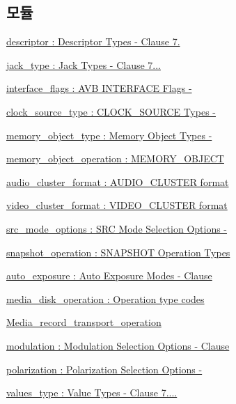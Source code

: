 \subsection*{모듈}
\begin{DoxyCompactItemize}
\item 
\hyperlink{group__descriptor}{descriptor \+: Descriptor Types -\/ Clause 7.}
\item 
\hyperlink{group__jack__type}{jack\+\_\+type \+: Jack Types -\/ Clause 7...}
\item 
\hyperlink{group__avb__interface__flags}{interface\+\_\+flags \+: A\+V\+B I\+N\+T\+E\+R\+F\+A\+C\+E Flags -\/}
\item 
\hyperlink{group__clock__source__type}{clock\+\_\+source\+\_\+type \+: C\+L\+O\+C\+K\+\_\+\+S\+O\+U\+R\+C\+E Types -\/}
\item 
\hyperlink{group__memory__object__type}{memory\+\_\+object\+\_\+type \+: Memory Object Types -\/}
\item 
\hyperlink{group__memory__object__operation}{memory\+\_\+object\+\_\+operation \+: M\+E\+M\+O\+R\+Y\+\_\+\+O\+B\+J\+E\+CT}
\item 
\hyperlink{group__audio__cluster__format}{audio\+\_\+cluster\+\_\+format \+: A\+U\+D\+I\+O\+\_\+\+C\+L\+U\+S\+T\+E\+R format}
\item 
\hyperlink{group__video__cluster__format}{video\+\_\+cluster\+\_\+format \+: V\+I\+D\+E\+O\+\_\+\+C\+L\+U\+S\+T\+E\+R format}
\item 
\hyperlink{group__src__mode__options}{src\+\_\+mode\+\_\+options \+: S\+R\+C Mode Selection Options -\/}
\item 
\hyperlink{group__snapshot__operation}{snapshot\+\_\+operation \+: S\+N\+A\+P\+S\+H\+O\+T Operation Types}
\item 
\hyperlink{group__auto__exposure}{auto\+\_\+exposure \+: Auto Exposure Modes -\/ Clause}
\item 
\hyperlink{group__media__disk__operation}{media\+\_\+disk\+\_\+operation \+: Operation type codes}
\item 
\hyperlink{group__media__record__transport__operation}{Media\+\_\+record\+\_\+transport\+\_\+operation}
\item 
\hyperlink{group__modulation}{modulation \+: Modulation Selection Options -\/ Clause}
\item 
\hyperlink{group__polarization}{polarization \+: Polarization Selection Options -\/}
\item 
\hyperlink{group__values__type}{values\+\_\+type \+: Value Types -\/ Clause 7....}

\end{DoxyCompactItemize}
